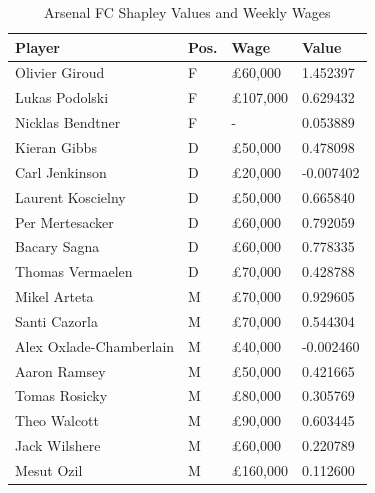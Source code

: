 \documentclass[a4paper,10pt]{article}
\begin{document}
  {\renewcommand{\arraystretch}{1.5}
  \begin{table}
    \begin{tabular*}{\textwidth}{@{\extracolsep{\fill} } l l l l}
      Player & Pos. & Wage & Value \\
      \hline
      Olivier Giroud & F & \pounds60,000 & 1.452397 \\
      Lukas Podolski & F & \pounds107,000 & 0.629432 \\
      Nicklas Bendtner & F & - & 0.053889 \\
      \hline
      Kieran Gibbs & D & \pounds50,000 & 0.478098 \\
      Carl Jenkinson & D & \pounds20,000 & -0.007402 \\
      Laurent Koscielny & D & \pounds50,000 & 0.665840 \\
      Per Mertesacker & D & \pounds60,000 & 0.792059 \\
      Bacary Sagna & D & \pounds60,000 & 0.778335 \\
      Thomas Vermaelen & D & \pounds70,000 & 0.428788 \\
      \hline
      Mikel Arteta & M & \pounds70,000 & 0.929605 \\
      Santi Cazorla & M & \pounds70,000 & 0.544304 \\
      Alex Oxlade-Chamberlain & M & \pounds40,000 & -0.002460 \\
      Aaron Ramsey & M & \pounds50,000 & 0.421665 \\
      Tomas Rosicky & M & \pounds80,000 & 0.305769 \\
      Theo Walcott & M & \pounds90,000 & 0.603445 \\
      Jack Wilshere & M & \pounds60,000 & 0.220789 \\
      Mesut Ozil & M & \pounds160,000 & 0.112600 \\
    \end{tabular*}
    \caption{Arsenal FC Shapley Values and Weekly Wages}
  \end{table}
  }
  
\end{document}
